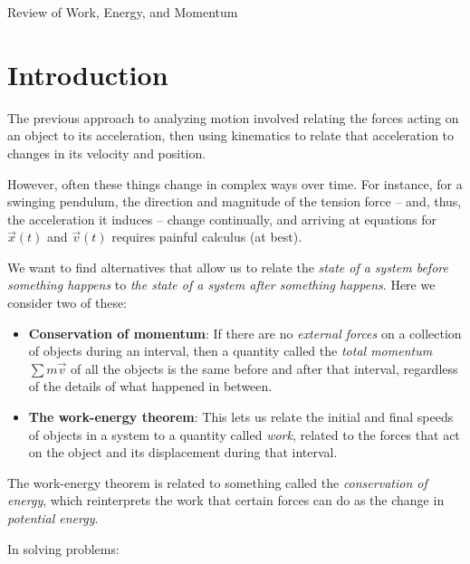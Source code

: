 \documentclass[10pt]{article}
\begin{document}
\begin{center}
	\sc \Large Review of Work, Energy, and Momentum
	
\end{center}

\section{Introduction}

The previous approach to analyzing motion involved relating the forces acting on an object to its acceleration, then using kinematics to relate that acceleration to changes in its velocity and  position.

However, often these things change in complex ways over time. For instance, for a swinging pendulum, the direction and magnitude of the tension force -- and, thus, the acceleration it induces -- change continually, and arriving at equations for $\vec x(t)$ and $\vec v(t)$ requires painful calculus (at best).

We want to find alternatives that allow us to relate the {\it state of a system before something happens} to {\it the state of a system after something happens}. Here we consider two of these:

\begin{itemize}
	\item {\bf Conservation of momentum}: If there are no {\it external forces} on a collection of objects during an interval, then a quantity called the {\it total momentum} $\sum m \vec v$ of all the objects is the same before and after that interval, regardless of the details of what happened in between.
	\item {\bf The work-energy theorem}: This lets us relate the initial and final speeds of objects in a system to a quantity called {\it work}, related to the forces that act on the object and its displacement during that interval.
\end{itemize}

The work-energy theorem is related to something called the {\it conservation of energy}, which reinterprets the work that certain forces can do as the change in {\it potential energy}.

In solving problems:
\end{document}
